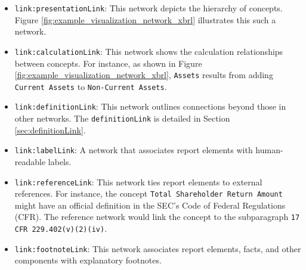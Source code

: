 \begin{itemize}
    \item \texttt{link:presentationLink}: This network depicts the hierarchy of concepts.
    Figure \ref{fig:example_visualization_network_xbrl} illustrates this such a network.
    \item \texttt{link:calculationLink}: This network shows the calculation relationships between concepts.
    For instance, as shown in Figure \ref{fig:example_visualization_network_xbrl}, 
    \texttt{Assets} results from adding \texttt{Current Assets} to \texttt{Non-Current Assets}.
    \item \texttt{link:definitionLink}: This network outlines connections beyond those in other networks.
    The \texttt{definitionLink} is detailed in Section \ref{sec:definitionLink}.
    \item \texttt{link:labelLink}: A network that associates report elements with human-readable labels.
    \item \texttt{link:referenceLink}: This network ties report elements to external references.
    For instance, the concept \texttt{Total Shareholder Return Amount} might have an official definition in the SEC's Code of Federal Regulations (CFR).
    The reference network would link the concept to the subparagraph \texttt{17 CFR 229.402(v)(2)(iv)}\cite{cfr_total_shareholder_return_amount}.
    \item \texttt{link:footnoteLink}: This network associates report elements, facts, and other components with explanatory footnotes.
\end{itemize}




